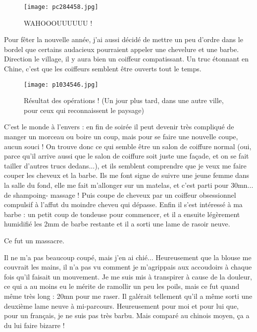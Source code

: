 \documentclass{book}
\begin{document}
\begin{figure}[h]
\centering
\texttt{[image: pc284458.jpg]}
\caption*{WAHOOOUUUUUU !}
\end{figure}

Pour fêter la nouvelle année, j'ai aussi décidé de mettre un peu d'ordre dans le bordel que certains audacieux pourraient appeler une chevelure et une barbe. Direction le village, il y aura bien un coiffeur compatissant. Un truc étonnant en Chine, c'est que les coiffeurs semblent être ouverts tout le temps. 


\begin{wrapfigure}{l}{0.55\textwidth}
\centering
\texttt{[image: p1034546.jpg]}
\caption*{Résultat des opérations ! (Un jour plus tard, dans une autre ville, pour ceux qui reconnaissent le paysage)}
\end{wrapfigure}

C'est le monde à l'envers : en fin de soirée il peut devenir très compliqué de manger un morceau ou boire un coup, mais pour se faire une nouvelle coupe, aucun souci ! On trouve donc ce qui semble être un salon de coiffure normal (oui, parce qu'il arrive aussi que le salon de coiffure soit juste une façade, et on se fait tailler d'autres trucs dedans...), et ils semblent comprendre que je veux me faire couper les cheveux et la barbe. Ils me font signe de suivre une jeune femme dans la salle du fond, elle me fait m'allonger sur un matelas, et c'est parti pour 30mn... de shampoing- massage ! Puis coupe de cheveux par un coiffeur obsessionnel compulsif à l'affut du moindre cheveu qui dépasse. Enfin il s'est intéressé à ma barbe : un petit coup de tondeuse pour commencer, et il a ensuite légèrement humidifié les 2mm de barbe restante et il a sorti une lame de rasoir neuve.

Ce fut un massacre.



Il ne m'a pas beaucoup coupé, mais j'en ai chié... Heureusement que la blouse me couvrait les mains, il n'a pas vu comment je m'agrippais aux accoudoirs à chaque fois qu'il faisait un mouvement. Je me suis mis à transpirer à cause de la douleur, ce qui a au moins eu le mérite de ramollir un peu les poils, mais ce fut quand même très long : 20mn pour me raser. Il galérait tellement qu'il a même sorti une deuxième lame neuve à mi-parcours. Heureusement pour moi et pour lui que, pour un français, je ne suis pas très barbu. Mais comparé au chinois moyen, ça a du lui faire bizarre !
\end{document}
